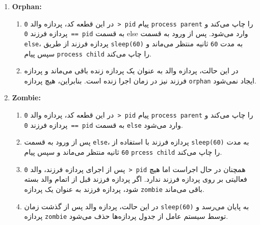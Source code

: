\begin{qsolve}
	\begin{enumerate}
		\item \textbf{Orphan:}
		\begin{enumerate}
			\item در این قطعه کد، پردازه والد \texttt{0 > pid} پیام \texttt{process parent} را چاپ می‌کند و پردازه فرزند \texttt{0 == pid} به قسمت else وارد می‌شود. پس از ورود به قسمت \texttt{else}، پردازه فرزند از طریق \texttt{sleep(60)} به مدت \texttt{60} ثانیه منتظر می‌ماند و سپس پیام \texttt{process child} را چاپ می‌کند.
			\item در این حالت، پردازه والد به عنوان یک پردازه زنده باقی می‌ماند و پردازه فرزند نیز در زمان اجرا زنده است. بنابراین، هیچ پردازه \texttt{orphan} ایجاد نمی‌شود.
		\end{enumerate}
		\item \textbf{Zombie:}
		\begin{enumerate}
			\item در این قطعه کد، پردازه والد \texttt{0 > pid} پیام \texttt{process parent} را چاپ می‌کند و پردازه فرزند \texttt{0 == pid} به قسمت \texttt{else} وارد می‌شود.
			\item پس از ورود به قسمت \texttt{else}، پردازه فرزند با استفاده از \texttt{sleep(60)} به مدت \texttt{60} ثانیه منتظر می‌ماند و سپس پیام \texttt{prcess child} را چاپ می‌کند.
			\item پس از اجرای پردازه فرزند، والد \texttt{0 > pid} همچنان در حال اجراست اما هیچ فعالیتی بر روی پردازه فرزند ندارد. اگر پردازه فرزند قبل از اتمام والد بسته شود، پردازه فرزند به عنوان یک پردازه \texttt{zombie} باقی می‌ماند.
			\item در این حالت، پردازه والد پس از گذشت زمان \texttt{sleep(60)} به پایان می‌رسد و پردازه \texttt{zombie} توسط سیستم عامل از جدول پردازه‌ها حذف می‌شود.
		\end{enumerate}
	\end{enumerate}
\end{qsolve}